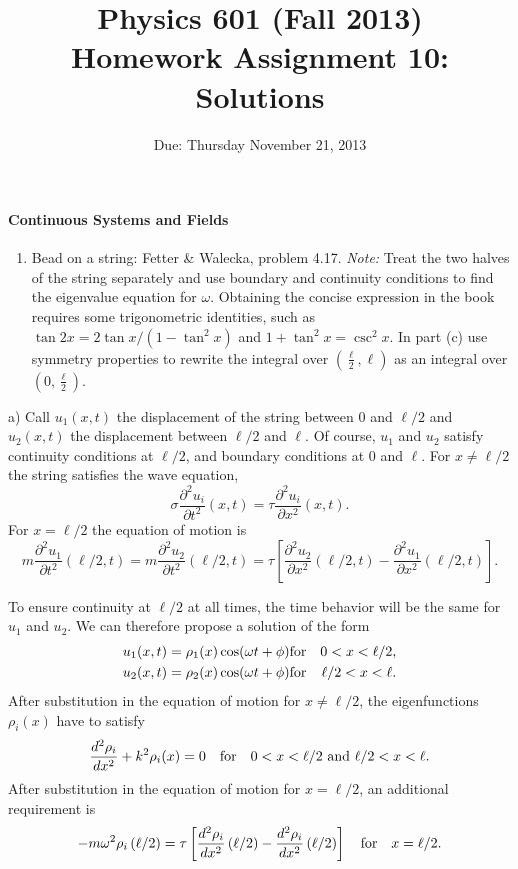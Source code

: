 \documentclass[letterpaper,11pt]{article}
\title{Physics 601 (Fall 2013) \\ Homework Assignment 10: Solutions}
\date{Due: Thursday November 21, 2013}
\begin{document}
\maketitle

\paragraph*{Continuous Systems and Fields}
\begin{enumerate}[resume]
 \item Bead on a string: Fetter \& Walecka, problem 4.17. \emph{Note:} Treat the two halves of the string separately and use boundary and continuity conditions to find the eigenvalue equation for $\omega$.  Obtaining the concise expression in the book requires some trigonometric identities, such as $\tan 2x = 2 \tan x / (1-\tan^2 x)$ and $1 + \tan^2 x = \csc^2 x$.  In part (c) use symmetry properties to rewrite the integral over $(\frac{\ell}{2},\ell)$ as an integral over $(0,\frac{\ell}{2})$.
\end{enumerate}

a) Call $u_1(x,t)$ the displacement of the string between $0$ and $\ell/2$ and $u_2(x,t)$ the displacement between $\ell/2$ and $\ell$.  Of course, $u_1$ and $u_2$ satisfy continuity conditions at $\ell/2$, and boundary conditions at $0$ and $\ell$.  For $x \ne \ell/2$ the string satisfies the wave equation,
\begin{equation*}
 \sigma \frac{\partial^2 u_i}{\partial t^2}\left(x,t\right) = \tau \frac{\partial^2 u_i}{\partial x^2}\left(x,t\right).
\end{equation*}
For $x = \ell/2$ the equation of motion is
\begin{equation*}
 m \frac{\partial^2 u_1}{\partial t^2}\left(\ell/2,t\right) = m \frac{\partial^2 u_2}{\partial t^2}\left(\ell/2,t\right) = \tau \left[ \frac{\partial^2 u_2}{\partial x^2}\left(\ell/2,t\right) - \frac{\partial^2 u_1}{\partial x^2}\left(\ell/2,t\right) \right].
\end{equation*}

To ensure continuity at $\ell/2$ at all times, the time behavior will be the same for $u_1$ and $u_2$.  We can therefore propose a solution of the form
\begin{eqnarray*}
 u_1(x,t) = \rho_1(x) \cos(\omega t + \phi) & \hbox{for} & 0 < x < \ell/2, \\
 u_2(x,t) = \rho_2(x) \cos(\omega t + \phi) & \hbox{for} & \ell/2 < x < \ell.
\end{eqnarray*}
After substitution in the equation of motion for $x \ne \ell/2$, the eigenfunctions $\rho_i(x)$ have to satisfy
\begin{equation*}
 \frac{d^2 \rho_i}{d x^2} + k^2 \rho_i(x) = 0 \quad \hbox{for} \quad 0< x < \ell/2 ~ \hbox{and} ~ \ell/2 < x < \ell.
\end{equation*}
After substitution in the equation of motion for $x = \ell/2$, an additional requirement is
\begin{equation*}
 -m \omega^2 \rho_i\left(\ell/2\right) = \tau \left[ \frac{d^2 \rho_i}{d x^2}\left(\ell/2\right) - \frac{d^2 \rho_i}{d x^2}\left(\ell/2\right) \right] \quad \hbox{for} \quad x = \ell/2.
\end{equation*}
\end{document}
